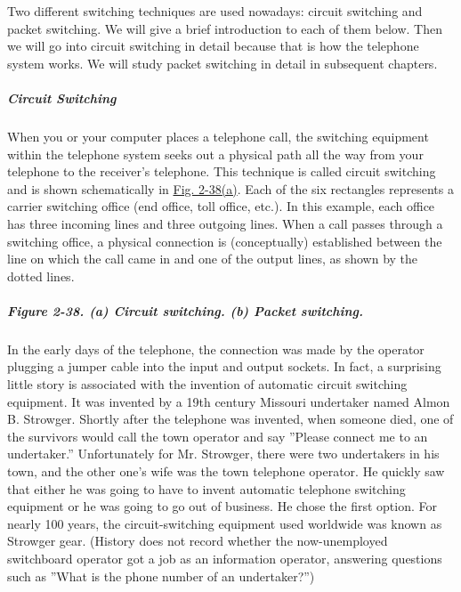 \documentclass[b5paper,11pt]{memoir}
\begin{document}
Two different switching techniques are used nowadays: circuit switching
and packet switching. We will give a brief introduction to each of them
below. Then we will go into circuit switching in detail because that is
how the telephone system works. We will study packet switching in detail
in subsequent chapters.

\protect\hypertarget{0130661023_ch02lev1sec5.htmlux5cux23ch02lev3sec16}{}{}

\subparagraph{Circuit Switching}

When you or your computer places a telephone call, the switching
equipment within the telephone system seeks out a physical path all the
way from your telephone to the receiver's telephone. This technique is
called {circuit switching} and is shown schematically in
\protect\hyperlink{0130661023_ch02lev1sec5.htmlux5cux23ch02fig38}{Fig.
2-38(a)}. Each of the six rectangles represents a carrier switching
office (end office, toll office, etc.). In this example, each office has
three incoming lines and three outgoing lines. When a call passes
through a switching office, a physical connection is (conceptually)
established between the line on which the call came in and one of the
output lines, as shown by the dotted lines.

\subparagraph[Figure 2-38. (a) Circuit switching. (b) Packet
switching.]{\texorpdfstring{\protect\hypertarget{0130661023_ch02lev1sec5.htmlux5cux23ch02fig38}{}{}Figure
2-38. (a) Circuit switching. (b) Packet
switching.}{Figure 2-38. (a) Circuit switching. (b) Packet switching.}}


In the early days of the telephone, the connection was made by the
operator plugging a jumper cable into the input and output sockets. In
fact, a surprising little story is associated with the invention of
automatic circuit switching equipment. It was invented by a 19th century
Missouri undertaker named Almon B. Strowger. Shortly after the telephone
was invented, when someone died, one of the survivors would call the
town operator and say ''Please connect me to an undertaker.''
Unfortunately for Mr. Strowger, there were two undertakers in his town,
and the other one's wife was the town telephone operator. He quickly saw
that either he was going to have to invent automatic telephone switching
equipment or he was going to go out of business. He chose the first
option. For nearly 100 years, the circuit-switching equipment used
worldwide was known as Strowger gear. (History does not record whether
the now-unemployed switchboard operator got a job as an information
operator, answering questions such as ''What is the phone number of an
undertaker?'')
\end{document}
